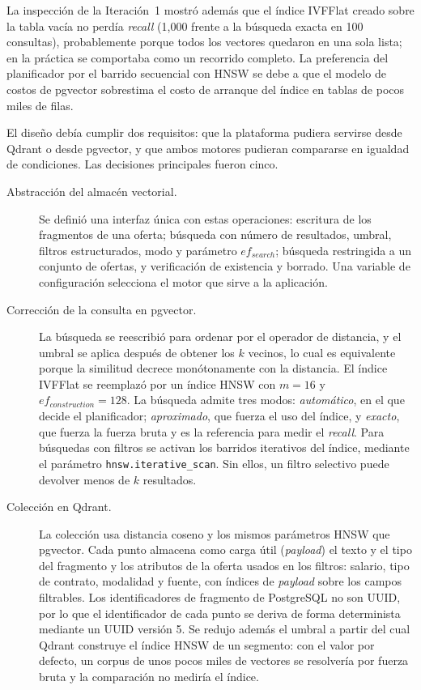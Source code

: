 La inspección de la Iteración~1 mostró además que el índice IVFFlat creado sobre la tabla vacía no perdía \textit{recall} (1,000 frente a la búsqueda exacta en 100 consultas), probablemente porque todos los vectores quedaron en una sola lista; en la práctica se comportaba como un recorrido completo. La preferencia del planificador por el barrido secuencial con HNSW se debe a que el modelo de costos de pgvector sobrestima el costo de arranque del índice en tablas de pocos miles de filas.

El diseño debía cumplir dos requisitos: que la plataforma pudiera servirse desde Qdrant \citep{QdrantDocs} o desde pgvector, y que ambos motores pudieran compararse en igualdad de condiciones. Las decisiones principales fueron cinco.

\begin{description}
    \item[Abstracción del almacén vectorial.] Se definió una interfaz única con estas operaciones: escritura de los fragmentos de una oferta; búsqueda con número de resultados, umbral, filtros estructurados, modo y parámetro $ef_{search}$; búsqueda restringida a un conjunto de ofertas, y verificación de existencia y borrado. Una variable de configuración selecciona el motor que sirve a la aplicación.
    \item[Corrección de la consulta en pgvector.] La búsqueda se reescribió para ordenar por el operador de distancia, y el umbral se aplica después de obtener los $k$ vecinos, lo cual es equivalente porque la similitud decrece monótonamente con la distancia. El índice IVFFlat se reemplazó por un índice HNSW \citep{Malkov2020} con $m = 16$ y $ef_{construction} = 128$. La búsqueda admite tres modos: \emph{automático}, en el que decide el planificador; \emph{aproximado}, que fuerza el uso del índice, y \emph{exacto}, que fuerza la fuerza bruta y es la referencia para medir el \textit{recall}. Para búsquedas con filtros se activan los barridos iterativos del índice, mediante el parámetro \texttt{hnsw.\allowbreak iterative\_scan}. Sin ellos, un filtro selectivo puede devolver menos de $k$ resultados.
    \item[Colección en Qdrant.] La colección usa distancia coseno y los mismos parámetros HNSW que pgvector. Cada punto almacena como carga útil (\textit{payload}) el texto y el tipo del fragmento y los atributos de la oferta usados en los filtros: salario, tipo de contrato, modalidad y fuente, con índices de \textit{payload} sobre los campos filtrables. Los identificadores de fragmento de PostgreSQL no son UUID, por lo que el identificador de cada punto se deriva de forma determinista mediante un UUID versión 5. Se redujo además el umbral a partir del cual Qdrant construye el índice HNSW de un segmento: con el valor por defecto, un corpus de unos pocos miles de vectores se resolvería por fuerza bruta y la comparación no mediría el índice.

\end{description}

